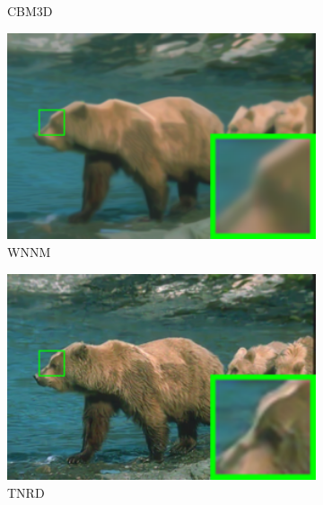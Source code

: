\begin{figure}
\begin{subfigure}[t]{0.24\textwidth}
		\caption{CBM3D}
    \end{subfigure}
    \hfill
    \begin{subfigure}[t]{0.24\textwidth}
        \centering
        \includegraphics[width=1\textwidth]{images/twsc/nc/resize_br_WNNM_bears.png}
\caption{WNNM}
    \end{subfigure}
    \hfill
    \begin{subfigure}[t]{0.24\textwidth}
        \centering
        \includegraphics[width=1\textwidth]{images/twsc/nc/resize_br_TRD_bears.png}
\caption{TNRD}
    \end{subfigure}
    \hfill
    \begin{subfigure}[t]{0.24\textwidth}
        \centering

\end{subfigure}
\end{figure}
